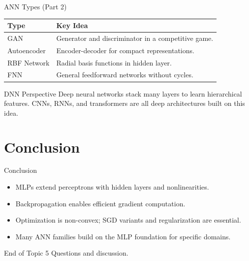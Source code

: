 \documentclass[10pt]{beamer}
\begin{document}
\begin{frame}{ANN Types (Part 2)}
  \justifying
  \begin{table}[ht]
    \centering
    \begin{tabular}{p{2.5cm} p{7cm}}
      \toprule
      \textbf{Type} & \textbf{Key Idea} \\
      \midrule
      GAN & Generator and discriminator in a competitive game. \\
      Autoencoder & Encoder-decoder for compact representations. \\
      RBF Network & Radial basis functions in hidden layer. \\
      FNN & General feedforward networks without cycles. \\
      \bottomrule
    \end{tabular}
  \end{table}
\end{frame}

\begin{frame}{DNN Perspective}
  \justifying
  Deep neural networks stack many layers to learn hierarchical features.
  CNNs, RNNs, and transformers are all deep architectures built on this idea.
\end{frame}

\section{Conclusion}

\begin{frame}{Conclusion}
  \justifying
  \begin{itemize}
    \item MLPs extend perceptrons with hidden layers and nonlinearities.
    \item Backpropagation enables efficient gradient computation.
    \item Optimization is non-convex; SGD variants and regularization are essential.
    \item Many ANN families build on the MLP foundation for specific domains.
  \end{itemize}
\end{frame}

\begin{frame}{End of Topic 5}
  \justifying
  Questions and discussion.
\end{frame}
\end{document}
